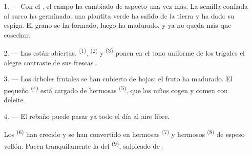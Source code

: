 %


\VUsaut{5.0mm}
\VUsaut{3.0mm}
\VUsaut{3.0mm}
\VUsaut{4.0mm}
\VUsaut{3.0mm}

1. --- Con el , el campo ha cambiado de aspecto una vez más.
La semilla confiada al surco ha germinado; una plantita verde ha salido
de la tierra y ha dado su espiga. El grano se ha formado, luego ha
madurado, y ya no queda más que cosechar.

2. --- Las  están abiertas. 
\textsuperscript{(1)},  \textsuperscript{(2)} y 
\textsuperscript{(3)} ponen en el tono uniforme de los trigales el alegre
contraste de sus frescas .

3. --- Los árboles frutales se han cubierto de hojas; el fruto ha
madurado. El pequeño  \textsuperscript{(4)} está cargado de hermosas
 \textsuperscript{(5)}, que los niños cogen y comen con deleite.

4. --- El rebaño puede pasar ya todo el día al aire libre.

Los  \textsuperscript{(6)} han crecido y se han convertido en
hermosas  \textsuperscript{(7)} y hermosos 
\textsuperscript{(8)} de espeso vellón. Pacen tranquilamente la  del
 \textsuperscript{(9)}, salpicado de .

